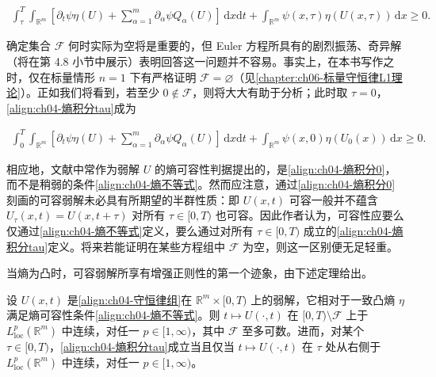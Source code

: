 \documentclass[../../main.tex]{subfiles}
\begin{document}
\begin{align}
\int_{\tau}^{T}\int_{\mathbb{R}^{m}}\left[\partial_{t}\psi\eta(U)+\sum_{\alpha=1}^{m}\partial_{\alpha}\psi Q_{\alpha}(U)\right]\,\mathrm{d}x\mathrm{d}t+\int_{\mathbb{R}^{m}}\psi(x,\tau)\eta(U(x,\tau))\,\mathrm{d}x\geqslant 0.
\label{align:ch04-熵积分tau}
\end{align}

确定集合 $\mathscr{F}$ 何时实际为空将是重要的，但 Euler 方程所具有的剧烈振荡、奇异解（将在第 4.8 小节中展示）表明回答这一问题并不容易。事实上，在本书写作之时，仅在标量情形 $n=1$ 下有严格证明 $\mathscr{F}=\varnothing $（见\cref{chapter:ch06-标量守恒律L1理论}）。正如我们将看到，若至少 $0\notin\mathscr{F}$，则将大大有助于分析；此时取 $\tau=0$，\eqref{align:ch04-熵积分tau}成为

\begin{align}
\int_{0}^{T}\int_{\mathbb{R}^{m}}\left[\partial_{t}\psi\eta(U)+\sum_{\alpha=1}^{m}\partial_{\alpha}\psi Q_{\alpha}(U)\right]\,\mathrm{d}x\mathrm{d}t+\int_{\mathbb{R}^{m}}\psi(x,0)\eta(U_{0}(x))\,\mathrm{d}x\geqslant 0.
\label{align:ch04-熵积分0}
\end{align}

相应地，文献中常作为弱解 $U$ 的熵可容性判据提出的，是\eqref{align:ch04-熵积分0}，而不是稍弱的条件\eqref{align:ch04-熵不等式}。然而应注意，通过\eqref{align:ch04-熵积分0}刻画的可容弱解未必具有所期望的半群性质：即 $U(x,t)$ 可容一般并不蕴含 $U_{\tau}(x,t)=U(x,t+\tau)$ 对所有 $\tau\in[0,T)$ 也可容。因此作者认为，可容性应要么仅通过\eqref{align:ch04-熵不等式}定义，要么通过对所有 $\tau\in[0,T)$ 成立的\eqref{align:ch04-熵积分tau}定义。将来若能证明在某些方程组中 $\mathscr{F}$ 为空，则这一区别便无足轻重。

当熵为凸时，可容弱解所享有增强正则性的第一个迹象，由下述定理给出。

\begin{theorem}\label{theorem:ch04-熵凸正则性}
设 $U(x,t)$ 是\eqref{align:ch04-守恒律组}在 $\mathbb{R}^{m}\times[0,T)$ 上的弱解，它相对于一致凸熵 $\eta$ 满足熵可容性条件\eqref{align:ch04-熵不等式}。则 $t\mapsto U(\cdot,t)$ 在 $[0,T)\setminus\mathscr{F}$ 上于 $L_{\mathrm{loc}}^{p}(\mathbb{R}^{m})$ 中连续，对任一 $p\in[1,\infty)$，其中 $\mathscr{F}$ 至多可数。进而，对某个 $\tau\in[0,T)$，\eqref{align:ch04-熵积分tau}成立当且仅当 $t\mapsto U(\cdot,t)$ 在 $\tau$ 处从右侧于 $L_{\mathrm{loc}}^{p}(\mathbb{R}^{m})$ 中连续，对任一 $p\in[1,\infty)$。
\end{theorem}
\end{document}
